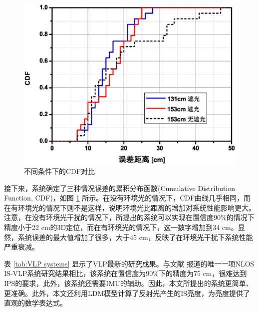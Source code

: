  \begin{figure}[!t]
                \centering
                \includegraphics[width=0.7\linewidth]{FIG/5-10.eps}
                \caption{不同条件下的CDF对比}
                \label{fig:cdf}
 \end{figure}

接下来，系统确定了三种情况误差的累积分布函数(Cumulative Distribution Function, CDF)，如图 \ref{fig:cdf} 所示。在没有环境光的情况下，CDF曲线几乎相同，而在有环境光的情况下则不是这样，说明环境光比距离的增加对系统性能影响更大。注意，在没有环境光干扰的情况下，所提出的系统可以实现在置信度90$\%$的情况下精度小于22 cm的3D定位，而在有环境光的情况下，这一数字增加到34 cm。显然，系统误差的最大值增加了很多，大于45 cm，反映了在环境光干扰下系统性能严重衰减。

表 \ref{tab:VLP systems} 显示了VLP最新的研究成果。与文献 \parencite{vlp-yang2019visible} 报道的唯一一项NLOS IS-VLP系统研究结果相比，该系统在置信度为90$\%$下的精度为75 cm，很难达到IPS的要求，此外，该系统还需要IMU的辅助。因此，本文所提出的系统更简单、更准确。此外，本文还利用LDM模型计算了反射光产生的IS亮度，为亮度提供了直观的数学表达式。

